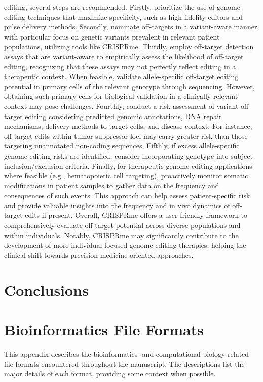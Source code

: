 \documentclass[a4paper, titlepage, openright]{book}
\newcommand{\mychapter}[2]{
    \setcounter{chapter}{#1}
    \setcounter{section}{0}
    \chapter*{#2}
    \addcontentsline{toc}{chapter}{#2}
}
\newcommand{\crisprme}{CRISPRme\xspace}
\begin{document}
editing, several steps are recommended. Firstly, prioritize the use of genome editing techniques that maximize specificity, such as high-fidelity editors and pulse delivery methods. Secondly, nominate off-targets in a variant-aware manner, with particular focus on genetic variants prevalent in relevant patient populations, utilizing tools like \crisprme. Thirdly, employ off-target detection assays that are variant-aware to empirically assess the likelihood of off-target editing, recognizing that these assays may not perfectly reflect editing in a therapeutic context. When feasible, validate allele-specific off-target editing potential in primary cells of the relevant genotype through sequencing. However, obtaining such primary cells for biological validation in a clinically relevant context may pose challenges. Fourthly, conduct a risk assessment of variant off-target editing considering predicted genomic annotations, DNA repair mechanisms, delivery methods to target cells, and disease context. For instance, off-target edits within tumor suppressor loci may carry greater risk than those targeting unannotated non-coding sequences. Fifthly, if excess allele-specific genome editing risks are identified, consider incorporating genotype into subject inclusion/exclusion criteria. Finally, for therapeutic genome editing applications where feasible (e.g., hematopoietic cell targeting), proactively monitor somatic modifications in patient samples to gather data on the frequency and consequences of such events. This approach can help assess patient-specific risk and provide valuable insights into the frequency and in vivo dynamics of off-target edits if present. Overall, \crisprme offers a user-friendly framework to comprehensively evaluate off-target potential across diverse populations and within individuals. Notably, \crisprme may significantly contribute to the development of more individual-focused genome editing therapies, helping the clinical shift towards precision medicine-oriented approaches. 


\mychapter{10}{Conclusions}


\appendix
\chapter{Bioinformatics File Formats}\label{appendix:fileformats}
This appendix describes the bioinformatics- and computational biology-related file formats encountered throughout the manuscript. The descriptions list the major details of each format, providing some context when possible. 
\end{document}
